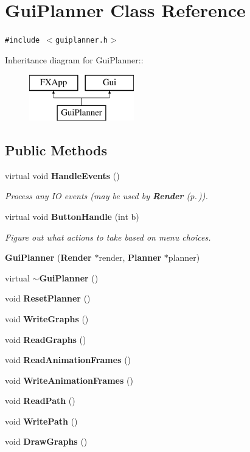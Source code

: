 \section{Gui\-Planner  Class Reference}
\label{class_GuiPlanner}
{\tt \#include $<$guiplanner.h$>$}

Inheritance diagram for Gui\-Planner::\begin{figure}[H]
\begin{center}
\leavevmode
\includegraphics[height=2cm]{class_GuiPlanner}
\end{center}
\end{figure}
\subsection*{Public Methods}
\begin{CompactItemize}
\item 
virtual void {\bf Handle\-Events} ()
\begin{CompactList}\small\item\em Process any IO events (may be used by {\bf Render} {\rm (p.\,\pageref{class_Render})}).\item\end{CompactList}\item 
virtual void {\bf Button\-Handle} (int b)
\begin{CompactList}\small\item\em Figure out what actions to take based on menu choices.\item\end{CompactList}\item 
{\bf Gui\-Planner} ({\bf Render} $\ast$render, {\bf Planner} $\ast$planner)
\item 
virtual {\bf $\sim$Gui\-Planner} ()
\item 
void {\bf Reset\-Planner} ()
\item 
void {\bf Write\-Graphs} ()
\item 
void {\bf Read\-Graphs} ()
\item 
void {\bf Read\-Animation\-Frames} ()
\item 
void {\bf Write\-Animation\-Frames} ()
\item 
void {\bf Read\-Path} ()
\item 
void {\bf Write\-Path} ()
\item 
void {\bf Draw\-Graphs} ()
\end{CompactItemize}
